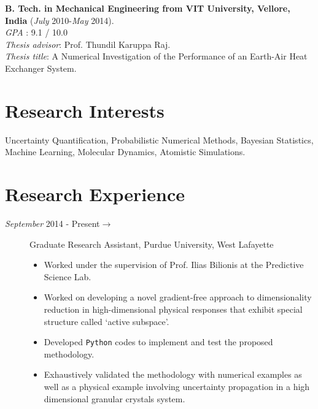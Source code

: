 \documentclass[margin,line,a4paper]{resume}
\begin{document}
\begin{resume}
    \textbf{B. Tech. in Mechanical Engineering from VIT University, Vellore, India}
    (\textit{July} 2010-\textit{May} 2014). \\
    \textit{GPA} : 9.1 / 10.0 \\
    \textit{Thesis advisor}: Prof. Thundil Karuppa Raj. \\
    \textit{Thesis title}: A Numerical Investigation of the Performance of an Earth-Air Heat Exchanger System.




\section{\mysidestyle Research Interests}
Uncertainty Quantification, Probabilistic Numerical Methods, Bayesian Statistics, Machine Learning, Molecular Dynamics, Atomistic Simulations.




\section{\mysidestyle Research Experience}
\begin{description}
\item[\textit{September} 2014 - Present$\rightarrow$] Graduate Research Assistant, Purdue University, West Lafayette
\begin{itemize}
\item Worked under the supervision of Prof. Ilias Bilionis at the Predictive Science Lab.
\item Worked on developing a novel gradient-free approach to dimensionality reduction in high-dimensional physical responses that exhibit special structure called `active subspace'.
\item Developed \texttt{Python} codes to implement and test the proposed methodology.
\item Exhaustively validated the methodology with numerical examples as well as a physical example involving uncertainty propagation in a high dimensional granular crystals system.
\end{itemize}
\end{description}





\end{resume}
\end{document}
